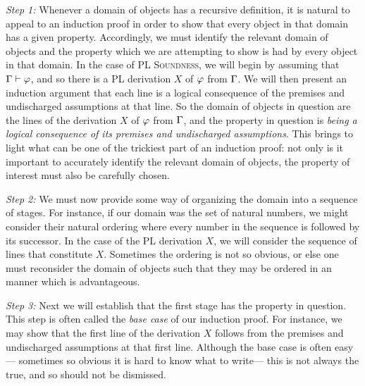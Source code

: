 \textit{Step 1:} 
Whenever a domain of objects has a recursive definition, it is natural to appeal to an induction proof in order to show that every object in that domain has a given property.
Accordingly, we must identify the relevant domain of objects and the property which we are attempting to show is had by every object in that domain.
In the case of \textsc{PL Soundness}, we will begin by assuming that $\Gamma \vdash \varphi$, and so there is a PL derivation $X$ of $\varphi$ from $\Gamma$.
We will then present an induction argument that each line is a logical consequence of the premises and undischarged assumptions at that line.
So the domain of objects in question are the lines of the derivation $X$ of $\varphi$ from $\Gamma$, and the property in question is \textit{being a logical consequence of its premises and undischarged assumptions}. 
This brings to light what can be one of the trickiest part of an induction proof: not only is it important to accurately identify the relevant domain of objects, the property of interest must also be carefully chosen.

\textit{Step 2:} 
We must now provide some way of organizing the domain into a sequence of stages.
For instance, if our domain was the set of natural numbers, we might consider their natural ordering where every number in the sequence is followed by its successor.
In the case of the PL derivation $X$, we will consider the sequence of lines that constitute $X$.
Sometimes the ordering is not so obvious, or else one must reconsider the domain of objects such that they may be ordered in an manner which is advantageous.

\textit{Step 3:} 
Next we will establish that the first stage has the property in question.
This step is often called the \textit{base case} of our induction proof.
For instance, we may show that the first line of the derivation $X$ follows from the premises and undischarged assumptions at that first line. %
Although the base case is often easy--- sometimes so obvious it is hard to know what to write--- this is not always the true, and so should not be dismissed.


